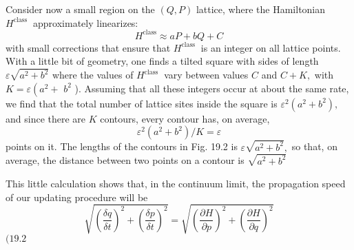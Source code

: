 \documentclass[main.tex]{subfiles}
\begin{document}
Consider now a small region on the $(Q, P)$ lattice, where the Hamiltonian $H^{\text {class }}$ approximately linearizes:
$$
H^{\mathrm{class}} \approx a P+b Q+C
$$
with small corrections that ensure that $H^{\text {class }}$ is an integer on all lattice points. With a little bit of geometry, one finds a tilted square with sides of length $\varepsilon \sqrt{a^{2}+b^{2}}$ where the values of $H^{\text {class }}$ vary between values $C$ and $C+K,$ with $K=\varepsilon\left(a^{2}+\right.$ $b^{2}$ ). Assuming that all these integers occur at about the same rate, we find that the total number of lattice sites inside the square is $\varepsilon^{2}\left(a^{2}+b^{2}\right),$ and since there are $K$ contours, every contour has, on average,
$$
\varepsilon^{2}\left(a^{2}+b^{2}\right) / K=\varepsilon
$$
points on it. The lengths of the contours in Fig. 19.2 is $\varepsilon \sqrt{a^{2}+b^{2}},$ so that, on average, the distance between two points on a contour is $\sqrt{a^{2}+b^{2}}$

This little calculation shows that, in the continuum limit, the propagation speed of our updating procedure will be
$$
\sqrt{\left(\frac{\delta q}{\delta t}\right)^{2}+\left(\frac{\delta p}{\delta t}\right)^{2}}=\sqrt{\left(\frac{\partial H}{\partial p}\right)^{2}+\left(\frac{\partial H}{\partial q}\right)^{2}}
$$
$(19.2$
\end{document}
